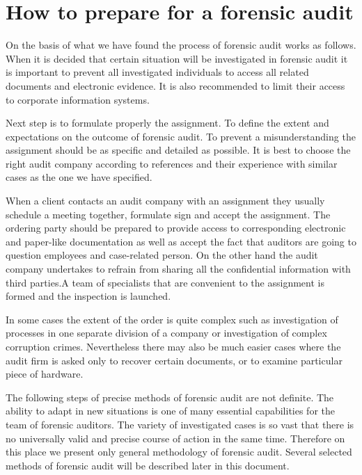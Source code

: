 


\section{How to prepare for a forensic audit}

On the basis of what we have found the process of forensic audit works as follows. When it is decided that certain situation will be investigated in forensic audit it is important to prevent all investigated individuals to access all related documents and electronic evidence. It is also recommended to limit their access to corporate information systems. 

Next step is to formulate properly the assignment. To define the extent and expectations on the outcome of forensic audit. To prevent a misunderstanding the assignment should be as specific and detailed as possible. It is best to choose the right audit company according to references and their experience with similar cases as the one we have specified.

When a client contacts an audit company with an assignment they usually schedule a meeting together, formulate sign and accept the assignment. The ordering party should be prepared to provide access to corresponding electronic and paper-like documentation as well as accept the fact that auditors are going to question employees and case-related person. On the other hand the audit company undertakes to refrain from sharing all the confidential information with third parties.A team of specialists that are convenient to the assignment is formed and the inspection is launched. 

In some cases the extent of the order is quite complex such as investigation of processes in one separate division of a company or investigation of complex corruption crimes. Nevertheless there may also be much easier cases where the audit firm is asked only to recover certain documents, or to examine particular piece of hardware. 

The following steps of precise methods of forensic audit are not definite. The ability to adapt in new situations is one of many essential capabilities for the team of forensic auditors. The variety of investigated cases is so vast that there is no universally valid and precise course of action in the same time. Therefore on this place we present only general methodology of forensic audit. Several selected methods of forensic audit will be described later in this document. 

